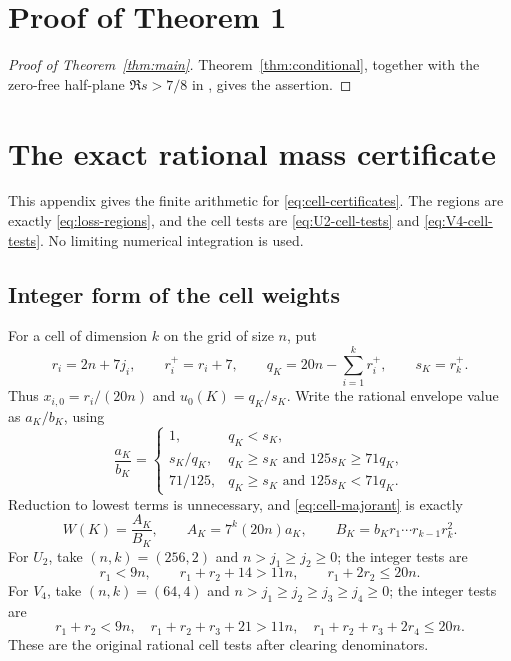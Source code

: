 \documentclass{amsart}
\numberwithin{equation}{section}
\numberwithin{table}{section}
\begin{document}
\section{Proof of Theorem 1}\label{sec:proof-main}

\begin{proof}[Proof of Theorem~\ref{thm:main}]
Theorem~\ref{thm:conditional}, together with the zero-free half-plane
$\Re s>7/8$ in \cite[Theorem~1.1]{OA}, gives the assertion.
\end{proof}

\appendix
\section{The exact rational mass certificate}\label{app:certificate}

This appendix gives the finite arithmetic for
\eqref{eq:cell-certificates}. The regions are exactly
\eqref{eq:loss-regions}, and the cell tests are \eqref{eq:U2-cell-tests}
and \eqref{eq:V4-cell-tests}. No limiting numerical integration is used.

\subsection{Integer form of the cell weights}

For a cell of dimension $k$ on the grid of size $n$, put
\[
r_i=2n+7j_i,\qquad r_i^+=r_i+7,\qquad
q_K=20n-\sum_{i=1}^k r_i^+,\qquad s_K=r_k^+.
\]
Thus $x_{i,0}=r_i/(20n)$ and $u_0(K)=q_K/s_K$. Write the rational
envelope value as $a_K/b_K$, using
\begin{equation}\label{eq:integer-envelope}
\frac{a_K}{b_K}=
\begin{cases}
1,&q_K<s_K,\\
s_K/q_K,&q_K\ge s_K\text{ and }125s_K\ge71q_K,\\
71/125,&q_K\ge s_K\text{ and }125s_K<71q_K.
\end{cases}
\end{equation}
Reduction to lowest terms is unnecessary, and \eqref{eq:cell-majorant}
is exactly
\begin{equation}\label{eq:integer-cell-weight}
W(K)=\frac{A_K}{B_K},\qquad
A_K=7^k(20n)a_K,\qquad
B_K=b_Kr_1\cdots r_{k-1}r_k^2.
\end{equation}
For $U_2$, take $(n,k)=(256,2)$ and $n>j_1\ge j_2\ge0$; the integer
tests are
\begin{equation}\label{eq:integer-U2-tests}
r_1<9n,\qquad r_1+r_2+14>11n,\qquad r_1+2r_2\le20n.
\end{equation}
For $V_4$, take $(n,k)=(64,4)$ and $n>j_1\ge j_2\ge j_3\ge j_4\ge0$;
the integer tests are
\begin{equation}\label{eq:integer-V4-tests}
r_1+r_2<9n,\quad r_1+r_2+r_3+21>11n,\quad
r_1+r_2+r_3+2r_4\le20n.
\end{equation}
These are the original rational cell tests after clearing denominators.
\end{document}
